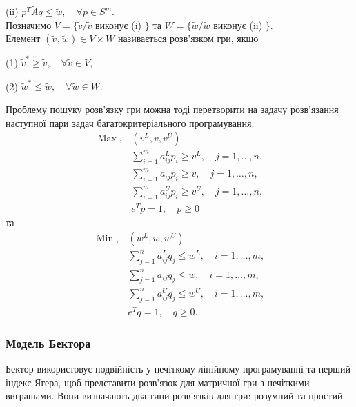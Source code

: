 \documentclass[14pt, a4paper, oneside]{extarticle}
\numberwithin{equation}{section}
\newcommand{\geqslant}{\geq}
\newcommand{\leqslant}{\leq}
\begin{document}
(ii) $p^{T} \tilde{A} \bar{q} \leqslant \tilde{w}, \quad \forall p \in S^{m}$.\\
Позначимо $V=\{\tilde{v} / \tilde{v}$ виконує (i) $\}$ та $W=\{\tilde{w} / \tilde{w}$ виконує (ii) $\}$.\\
Елемент $\left(\tilde{v}^{}, \tilde{w}^{}\right) \in V \times W$ називається розв'язком гри, якщо

(1) $\tilde{v}^{*} \tilde{\geqslant} \tilde{v}, \quad \forall \tilde{v} \in V$,

(2) $\tilde{w}^{*} \tilde{\leqslant} \tilde{w}, \quad \forall \tilde{w} \in W$.

Проблему пошуку розв'язку гри можна тоді перетворити на задачу розв'язання наступної пари задач багатокритеріального програмування:
\begin{equation}
\begin{aligned}
\operatorname{Max}, & \left(v^{L}, v, v^{U}\right) \\
& \sum_{i=1}^{m} a_{i j}^{L} p_{i} \geqslant v^{L}, \quad j=1, \ldots, n, \\
& \sum_{i=1}^{m} a_{i j} p_{i} \geqslant v, \quad j=1, \ldots, n, \\
& \sum_{i=1}^{m} a_{i j}^{U} p_{i} \geqslant v^{U}, \quad j=1, \ldots, n, \\
& e^{T} p=1, \quad p \geqslant 0
\end{aligned}
\end{equation}
та
\begin{equation}
\begin{aligned}
\operatorname{Min} , & \left(w^{L}, w, w^{U}\right) \\
& \sum_{j=1}^{n} a_{i j}^{L} q_{j} \leqslant w^{L}, \quad i=1, \ldots, m, \\
& \sum_{j=1}^{n} a_{i j} q_{j} \leqslant w, \quad i=1, \ldots, m, \\
& \sum_{j=1}^{n} a_{i j}^{U} q_{j} \leqslant w^{U}, \quad i=1, \ldots, m, \\
& e^{T} q=1, \quad q \geqslant 0 .
\end{aligned}
\end{equation}

\subsubsection{Модель Бектора}
Бектор використовує подвійність у нечіткому лінійному програмуванні та перший індекс Ягера, щоб представити розв'язок для матричної гри з нечіткими виграшами. Вони визначають два типи розв'язків для гри: розумний та простий.
\end{document}
